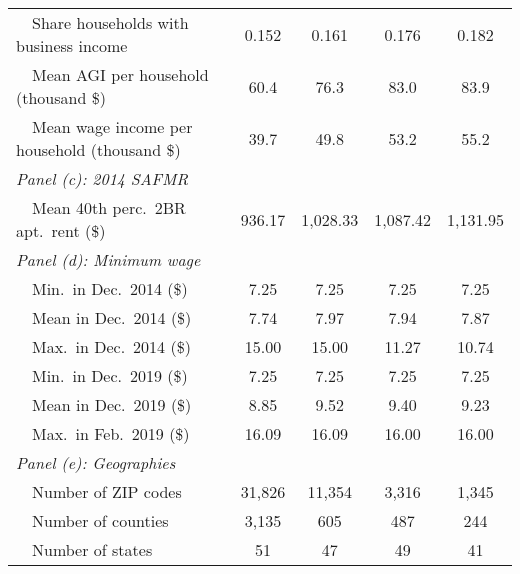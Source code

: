 \begin{landscape}
\begin{table}[hbt!]
\begin{tabular}{@{}lcccc@{}}
        $\quad$Share households with business income         & 0.152    & 0.161   & 0.176   & 0.182          \\
        $\quad$Mean AGI per household (thousand \$)          & 60.4 & 76.3 & 83.0 & 83.9     \\
        $\quad$Mean wage income per household (thousand \$)  & 39.7 & 49.8 & 53.2 & 55.2     \\
        \textit{Panel (c): 2014 SAFMR}                         &       &       &        &               \\
        $\quad$Mean 40th perc.\ 2BR apt.\ rent (\$)          & 936.17   & 1,028.33  & 1,087.42  & 1,131.95          \\
        \textit{Panel (d): Minimum wage}                       &       &       &        &              \\
        $\quad$Min.\ in Dec.\ 2014 (\$)                      & 7.25   & 7.25  & 7.25  & 7.25         \\
        $\quad$Mean in Dec.\ 2014 (\$)                       & 7.74   & 7.97  & 7.94  & 7.87         \\
        $\quad$Max.\ in Dec.\ 2014 (\$)                      & 15.00   & 15.00  & 11.27  & 10.74         \\
        $\quad$Min.\ in Dec.\ 2019 (\$)                      & 7.25   & 7.25  & 7.25  & 7.25         \\
        $\quad$Mean in Dec.\ 2019 (\$)                       & 8.85   & 9.52  & 9.40  & 9.23         \\
        $\quad$Max.\ in Feb.\ 2019 (\$)                      & 16.09   & 16.09  & 16.00  & 16.00         \\
        \textit{Panel (e): Geographies}                        &       &       &        &               \\
        $\quad$Number of ZIP codes                           & 31,826  & 11,354 & 3,316 & 1,345             \\
        $\quad$Number of counties                            & 3,135  & 605 & 487 & 244             \\
        $\quad$Number of states                              & 51  & 47 & 49 & 41             \\ \bottomrule
    \end{tabular}


\end{table}
\end{landscape}
